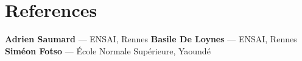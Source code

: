\section{References}
\small
\textbf{Adrien Saumard} --- ENSAI, Rennes \hspace{1.2em}
\textbf{Basile De Loynes} --- ENSAI, Rennes \hspace{1.2em}
\textbf{Sim\'eon Fotso} --- \'Ecole Normale Sup\'erieure, Yaound\'e



